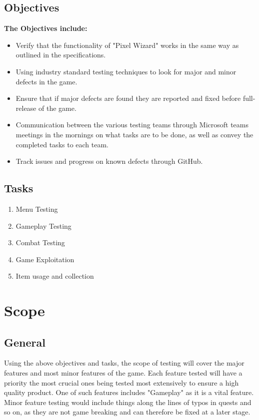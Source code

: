 \documentclass[a4paper, 10pt]{article}
\begin{document}
    \subsection{Objectives}
    \textbf{The Objectives include:}
    \begin{itemize}
        \item Verify that the functionality of "Pixel Wizard" works in the same way as       outlined in the specifications.
        \item Using industry standard testing techniques to look for major and minor defects in the game.
        \item Ensure that if major defects are found they are reported and fixed before full-release of the game.
        \item Communication between the various testing teams through Microsoft teams meetings in the mornings on what tasks are to be done, as well as convey the completed tasks to each team.
        \item Track issues and progress on known defects through GitHub.
    \end{itemize}
    
    \subsection{Tasks}
        \begin{enumerate}
        \item Menu Testing
        \item Gameplay Testing
        \item Combat Testing
        \item Game Exploitation
        \item Item usage and collection
    \end{enumerate}
    

\section{Scope}
    \subsection{General}
    Using the above objectives and tasks, the scope of testing will cover the major features and most minor features of the game. Each feature tested will have a priority the most crucial ones being tested most extensively to ensure a high quality product. One of such features includes "Gameplay" as it is a vital feature. \newline
    Minor feature testing would include things along the lines of typos in quests and so on, as they are not game breaking and can therefore be fixed at a later stage.
\end{document}
